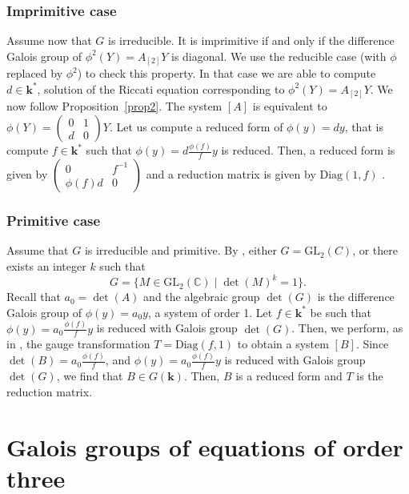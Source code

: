 \documentclass[a4paper,11pt]{amsart}
\newcommand{\GL}{\operatorname{GL}}
\def\k{\mathbf{k}}
\def\GL{\mathrm{GL}}
\begin{document}
\subsubsection*{Imprimitive case} Assume now that $G$ is irreducible.  It is imprimitive if and only if the difference Galois group of $\phi^2 (Y)=A_{[2]}Y$ is diagonal. We use the reducible case (with $\phi$ replaced by $\phi^2$) to check this property.   In that case we are able to compute $d\in \k^*$,  solution of the Riccati equation corresponding to $\phi^2 (Y)=A_{[2]}Y$.  We now follow Proposition~\ref{prop2}.  The system   $[A]$ is equivalent to $\phi (Y)=\left( \begin{array}{cc}
0 & 1\\
d & 0
\end{array}\right) Y$. 
Let us   compute a reduced form of $\phi(y)=dy$, that is compute $f\in \k^*$ such that $\phi(y)=d\frac{\phi(f)}{f}y$ is reduced.  Then, a reduced form is given by 
$\left( \begin{array}{cc}
0 &  f^{-1}\\
\phi(f)d & 0
\end{array}\right) $ and a reduction matrix is given by $\mathrm{Diag}(1,f)$ .  \par 
\subsubsection*{Primitive case}  Assume that $G$  is irreducible and  primitive. By \cite[Section 4.4]{hendriks1998algorithm},  either  $G=\mathrm{GL}_2 (C)$, or there exists an integer $k$ such that 
$$
G = \lbrace M\in\GL_2\left(\mathbb{C}\right) \mid \det(M)^{k}=1 \rbrace .
$$
 Recall that $a_0=\det(A)$ and the algebraic group $\det(G)$ is the difference Galois group of $\phi(y)=a_0 y$, a system of order 1. Let $f\in \k^*$ be such that $\phi(y)=a_0\frac{\phi(f)}{f}y$ is reduced with Galois group $\det(G)$.
Then, we perform, as in \cite[Section 4.4]{hendriks1998algorithm}, the gauge transformation  $T=\mathrm{Diag}(f,1)$ to obtain a system $[B]$.  Since $\det(B)=a_0\frac{\phi(f)}{f}$,   and $\phi(y)=a_0\frac{\phi(f)}{f}y$ is reduced with Galois group $\det(G)$,  we find that $B\in G(\mathbf{k})$.  Then,  $B$ is a reduced form and $T$ is the reduction matrix.  

\section{Galois groups of equations of order three}\label{secord3}
\end{document}
